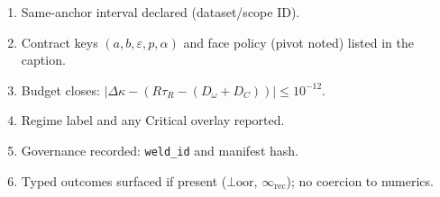 \begin{eqbox}
\small
\begin{enumerate}[leftmargin=1.25em]
  \item Same-anchor interval declared (dataset/scope ID).
  \item Contract keys $(a,b,\varepsilon,p,\alpha)$ and face policy (pivot noted) listed in the caption.
  \item Budget closes: $\bigl|\Delta\kappa-(R\tau_R-(D_\omega+D_C))\bigr|\le 10^{-12}$.
  \item Regime label and any Critical overlay reported.
  \item Governance recorded: \texttt{weld\_id} and manifest hash.
  \item Typed outcomes surfaced if present (\(\bot\!\mathrm{oor}\), \(\infty_{\mathrm{rec}}\)); no coercion to numerics.
\end{enumerate}
\end{eqbox}
